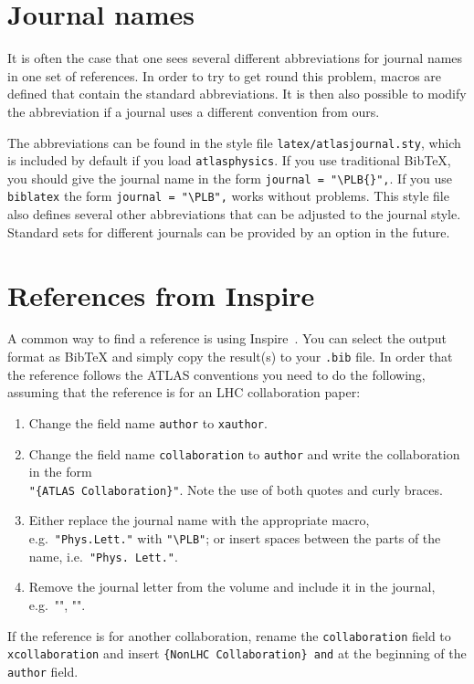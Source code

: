 \documentclass[UKenglish,texlive=2013]{latex/atlasdoc}
\newcommand*{\BibTeX}{Bib\TeX}
\newcommand{\File}[1]{\texttt{#1}\xspace}
\newcommand{\Package}[1]{\texttt{#1}\xspace}
\begin{document}
\section{Journal names}

It is often the case that one sees several different abbreviations for journal
names in one set of references.
In order to try to get round this problem, macros are defined that
contain the standard abbreviations.
It is then also possible to modify the abbreviation if a journal uses a different convention from ours.

The abbreviations can be found in the style file \File{latex/atlasjournal.sty},
which is included by default if you load \Package{atlasphysics}.
If you use traditional \BibTeX, you should give the journal name in the form
\verb|journal = "\PLB{}",|. 
If you use \Package{biblatex} the form \verb|journal = "\PLB",| works without problems.
This style file also defines several other abbreviations that can be adjusted to the
journal style. 
Standard sets for different journals can be provided by an option in the future.


\section{References from Inspire}
\label{sc:inquire}

A common way to find a reference is using Inspire~\cite{inspire}.
You can select the output format as BibTeX and simply copy the result(s) to your \File{.bib} file.
In order that the reference follows the ATLAS conventions you need to do the following,
assuming that the reference is for an LHC collaboration paper:
\begin{enumerate}
\item Change the field name \texttt{author} to \texttt{xauthor}.
\item Change the field name \texttt{collaboration} to \texttt{author} and write the collaboration in the form\\
  \verb|"{ATLAS Collaboration}"|. Note the use of both quotes and curly braces.
\item Either replace the journal name with the appropriate macro, e.g.\ \verb|"Phys.Lett."| with
  \verb|"\PLB"|; or insert spaces between the parts of the name, i.e.\ \verb|"Phys. Lett."|.
\item Remove the journal letter from the volume and include it in the journal,
  e.g.\ "\EPJC", "\PRD". 
\end{enumerate}
If the reference is for another collaboration, rename the \texttt{collaboration} field to
\texttt{xcollaboration} and insert \verb|{NonLHC Collaboration} and| at the beginning of the 
\texttt{author} field.
\end{document}
